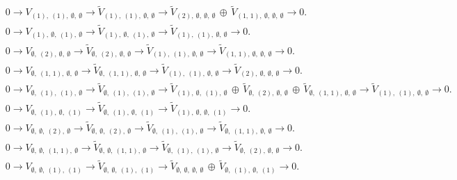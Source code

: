 \documentclass[openany, a4paper]{amsbook}
\theoremstyle{definition}
\numberwithin{equation}{chapter}
\begin{document}
\begin{align*} &
0 \to 
V_{ (1), \ (1), \ \emptyset, \ \emptyset }\to
\tilde{V}_{ (1), \ (1), \ \emptyset, \ \emptyset }
\to
\tilde{V}_{ (2), \ \emptyset, \ \emptyset, \ \emptyset }\,\oplus\,\tilde{V}_{ (1,\,1), \ \emptyset, \ \emptyset, \ \emptyset }
\to 0.
\\ &
0 \to 
V_{ (1), \ \emptyset, \ (1), \ \emptyset }\to
\tilde{V}_{ (1), \ \emptyset, \ (1), \ \emptyset }
\to
\tilde{V}_{ (1), \ (1), \ \emptyset, \ \emptyset }
\to 0.
\\ &
0 \to 
V_{ \emptyset, \ (2), \ \emptyset, \ \emptyset }\to
\tilde{V}_{ \emptyset, \ (2), \ \emptyset, \ \emptyset }
\to
\tilde{V}_{ (1), \ (1), \ \emptyset, \ \emptyset }
\to
\tilde{V}_{ (1,\,1), \ \emptyset, \ \emptyset, \ \emptyset }
\to 0.
\\ &
0 \to 
V_{ \emptyset, \ (1,\,1), \ \emptyset, \ \emptyset }\to
\tilde{V}_{ \emptyset, \ (1,\,1), \ \emptyset, \ \emptyset }
\to
\tilde{V}_{ (1), \ (1), \ \emptyset, \ \emptyset }
\to
\tilde{V}_{ (2), \ \emptyset, \ \emptyset, \ \emptyset }
\to 0.
\\ &
0 \to 
V_{ \emptyset, \ (1), \ (1), \ \emptyset }\to
\tilde{V}_{ \emptyset, \ (1), \ (1), \ \emptyset }
\to
\tilde{V}_{ (1), \ \emptyset, \ (1), \ \emptyset }\,\oplus\,\tilde{V}_{ \emptyset, \ (2), \ \emptyset, \ \emptyset }\,\oplus\,\tilde{V}_{ \emptyset, \ (1,\,1), \ \emptyset, \ \emptyset }
\to
\tilde{V}_{ (1), \ (1), \ \emptyset, \ \emptyset }
\to 0.
\\ &
0 \to 
V_{ \emptyset, \ (1), \ \emptyset, \ (1) }\to
\tilde{V}_{ \emptyset, \ (1), \ \emptyset, \ (1) }
\to
\tilde{V}_{ (1), \ \emptyset, \ \emptyset, \ (1) }
\to 0.
\\ &
0 \to 
V_{ \emptyset, \ \emptyset, \ (2), \ \emptyset }\to
\tilde{V}_{ \emptyset, \ \emptyset, \ (2), \ \emptyset }
\to
\tilde{V}_{ \emptyset, \ (1), \ (1), \ \emptyset }
\to
\tilde{V}_{ \emptyset, \ (1,\,1), \ \emptyset, \ \emptyset }
\to 0.
\\ &
0 \to 
V_{ \emptyset, \ \emptyset, \ (1,\,1), \ \emptyset }\to
\tilde{V}_{ \emptyset, \ \emptyset, \ (1,\,1), \ \emptyset }
\to
\tilde{V}_{ \emptyset, \ (1), \ (1), \ \emptyset }
\to
\tilde{V}_{ \emptyset, \ (2), \ \emptyset, \ \emptyset }
\to 0.
\\ &
0 \to 
V_{ \emptyset, \ \emptyset, \ (1), \ (1) }\to
\tilde{V}_{ \emptyset, \ \emptyset, \ (1), \ (1) }
\to
\tilde{V}_{ \emptyset, \ \emptyset, \ \emptyset, \ \emptyset }\,\oplus\,\tilde{V}_{ \emptyset, \ (1), \ \emptyset, \ (1) }
\to 0.
\end{align*}
\end{document}
